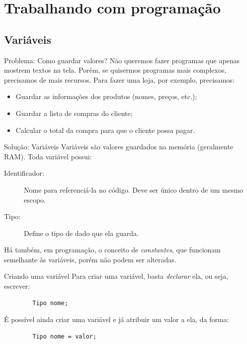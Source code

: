 \documentclass{beamer}
\begin{document}
\section{Trabalhando com programação}

\subsection{Variáveis}
\begin{frame}{Problema: Como guardar valores?}
    Não queremos fazer programas que apenas mostrem textos na tela. Porém, se
    quisermos programas mais complexos, precisamos de mais recursos.
    Para fazer uma loja, por exemplo, precisamos:

    \begin{itemize}
        \item Guardar as informações dos produtos (nomes, preços, etc.);
        \item Guardar a lista de compras do cliente;
        \item Calcular o total da compra para que o cliente possa pagar.
    \end{itemize}
\end{frame}

\begin{frame}{Solução: Variáveis}
    Variáveis são valores guardados na memória (geralmente RAM). Toda variável
    possui:
    \begin{description}
        \item[Identificador:] Nome para referenciá-la no código. Deve ser único
            dentro de um mesmo escopo.
        \item[Tipo:] Define o tipo de dado que ela guarda.
    \end{description}

    Há também, em programação, o conceito de \emph{constantes}, que funcionam
    semelhante às variáveis, porém não podem ser alteradas.
\end{frame}


\begin{frame}[fragile]{Criando uma variável}
    Para criar uma variável, basta \emph{declarar} ela, ou seja, escrever:

    \begin{verbatim}
        Tipo nome;
    \end{verbatim}

    É possível ainda criar uma variável e já atribuir um valor a ela, da forma:

    \begin{verbatim}
        Tipo nome = valor;
    \end{verbatim}
\end{frame}
\end{document}

